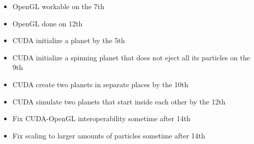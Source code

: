 \documentclass[a4paper]{article}
\begin{document}
\begin{itemize}
\item OpenGL workable on the 7th
\item OpenGL done on 12th\\

\item CUDA initialize a planet by the 5th
\item CUDA initialize a spinning planet that does not eject all its particles on the 9th
\item CUDA create two planets in separate places by the 10th
\item CUDA simulate two planets that start inside each other by the 12th\\

\item Fix CUDA-OpenGL interoperability sometime after 14th
\item Fix scaling to larger amounts of particles sometime after 14th\\
\end{itemize}



\end{document}
